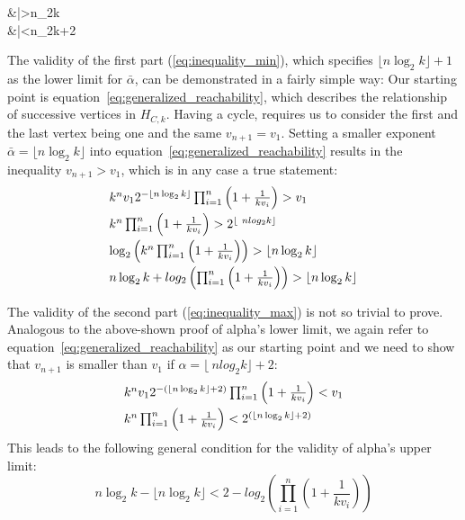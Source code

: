 \begin{samepage}
	\begin{flalign}
	\label{eq:inequality_min}
	&\bar\alpha>\lfloor n\log_2k\rfloor\\	
	\label{eq:inequality_max}
	&\bar\alpha<\lfloor n\log_2k\rfloor+2
	\end{flalign}
\end{samepage}

The validity of the first part (\ref{eq:inequality_min}), which specifies $\lfloor n\log_2k\rfloor+1$ as the lower limit for $\bar\alpha$, can be demonstrated in a fairly simple way: Our starting point is equation~\ref{eq:generalized_reachability}, which describes the relationship of successive vertices in $H_{C,k}$. Having a cycle, requires us to consider the first and the last vertex being one and the same $v_{n+1}=v_1$. Setting a smaller exponent $\bar\alpha=\lfloor n\log_2k\rfloor$ into equation~\ref{eq:generalized_reachability} results in the inequality $v_{n+1}>v_1$, which is in any case a true statement:
\begin{equation*}
\begin{array}{l}
k^nv_12^{-\lfloor n\log_2k\rfloor}\prod_{i=1}^{n}\left(1+\frac{1}{kv_{i}}\right)>v_1
\\[\medskipamount]
k^n\prod_{i=1}^{n}\left(1+\frac{1}{kv_{i}}\right)>2^{\lfloor\ nlog_2k\rfloor}
\\[\medskipamount]
\log_2\left(k^n\prod_{i=1}^{n}\left(1+\frac{1}{kv_{i}}\right)\right)>\lfloor n\log_2k\rfloor
\\[\medskipamount]
n\log_2k+log_2\left(\prod_{i=1}^{n}\left(1+\frac{1}{kv_{i}}\right)\right)>\lfloor n\log_2k\rfloor
\end{array}	
\end{equation*}

The validity of the second part (\ref{eq:inequality_max}) is not so trivial to prove. Analogous to the above-shown proof of alpha's lower limit, we again refer to equation~\ref{eq:generalized_reachability} as our starting point and we need to show that $v_{n+1}$ is smaller than $v_1$ if $\alpha=\lfloor\ nlog_2k\rfloor+2$:
\begin{equation*}
\begin{array}{l}
k^nv_12^{-\left(\lfloor n\log_2k\rfloor+2\right)}\prod_{i=1}^{n}\left(1+\frac{1}{kv_{i}}\right)<v_1
\\[\medskipamount]
k^n\prod_{i=1}^{n}\left(1+\frac{1}{kv_{i}}\right)<2^{\left(\lfloor n\log_2k\rfloor+2\right)}
\end{array}	
\end{equation*}
This leads to the following general condition for the validity of alpha's upper limit:
\begin{equation}
\label{eq:condition_max}
n\log_2k-\lfloor n\log_2k\rfloor<2-log_2\left(\prod_{i=1}^{n}\left(1+\frac{1}{kv_{i}}\right)\right)
\end{equation}

